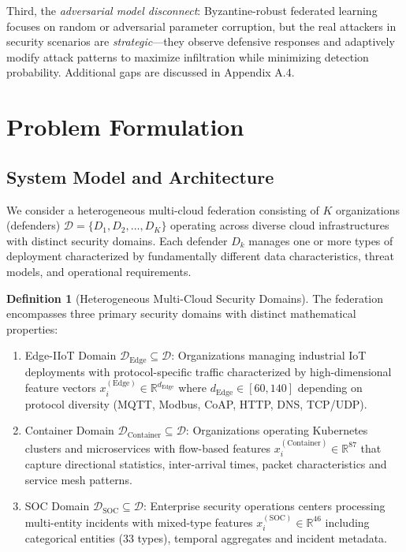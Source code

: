\documentclass[12pt,a4paper]{article}
\theoremstyle{definition}
\newtheorem{definition}[theorem]{Definition}
\newcommand{\R}{\mathbb{R}}
\newcommand{\D}{\mathcal{D}}
\begin{document}
Third, the \textit{adversarial model disconnect}: Byzantine-robust federated learning \cite{blanchard2017machine,yin2018byzantine} focuses on random or adversarial parameter corruption, but the real attackers in security scenarios are \textit{strategic}—they observe defensive responses and adaptively modify attack patterns to maximize infiltration while minimizing detection probability. Additional gaps are discussed in Appendix A.4.

\section{Problem Formulation}

\subsection{System Model and Architecture}

We consider a heterogeneous multi-cloud federation consisting of $K$ organizations (defenders) $\D = \{D_1, D_2, \ldots, D_K\}$ operating across diverse cloud infrastructures with distinct security domains. Each defender $D_k$ manages one or more types of deployment characterized by fundamentally different data characteristics, threat models, and operational requirements.

\begin{definition}[Heterogeneous Multi-Cloud Security Domains]
\label{def:security_domains}
The federation encompasses three primary security domains with distinct mathematical properties:
\begin{enumerate}
\item Edge-IIoT Domain $\D_{\text{Edge}} \subseteq \D$: Organizations managing industrial IoT deployments with protocol-specific traffic characterized by high-dimensional feature vectors $x_i^{(\text{Edge})} \in \R^{d_{\text{Edge}}}$ where $d_{\text{Edge}} \in [60, 140]$ depending on protocol diversity (MQTT, Modbus, CoAP, HTTP, DNS, TCP/UDP).

\item Container Domain $\D_{\text{Container}} \subseteq \D$: Organizations operating Kubernetes clusters and microservices with flow-based features $x_i^{(\text{Container})} \in \R^{87}$ that capture directional statistics, inter-arrival times, packet characteristics and service mesh patterns.

\item SOC Domain $\D_{\text{SOC}} \subseteq \D$: Enterprise security operations centers processing multi-entity incidents with mixed-type features $x_i^{(\text{SOC})} \in \R^{46}$ including categorical entities (33 types), temporal aggregates and incident metadata.
\end{enumerate}
\end{definition}
\end{document}
